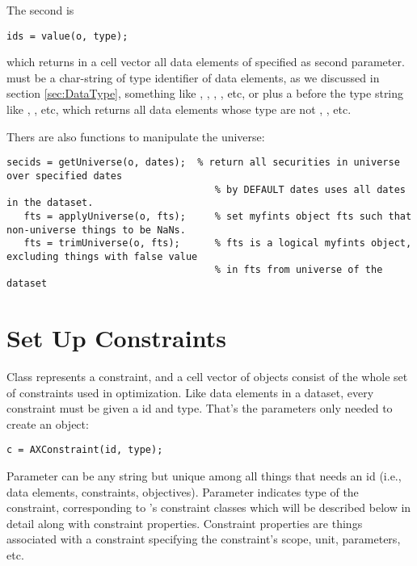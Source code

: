The second is 
\begin{lstlisting}[numbers=none]
   ids = value(o, type); 
\end{lstlisting}
which returns in a cell vector all data elements of  specified as second parameter.
 must be a char-string of type identifier of data elements,
as we discussed in section \ref{sec:DataType},
something like , , , , etc,
or plus a  before the type string like , , etc,
which returns all data elements whose type are not , , etc.

Thers are also functions to manipulate the universe:
\begin{lstlisting}[numbers=none]
   secids = getUniverse(o, dates);  % return all securities in universe over specified dates
                                    % by DEFAULT dates uses all dates in the dataset.
   fts = applyUniverse(o, fts);     % set myfints object fts such that non-universe things to be NaNs.
   fts = trimUniverse(o, fts);      % fts is a logical myfints object, excluding things with false value
                                    % in fts from universe of the dataset
\end{lstlisting}


\section{Set Up Constraints}

Class  represents a constraint,
and a cell vector of  objects consist of the whole set of constraints used in optimization.
Like data elements in a dataset, 
every constraint must be given a id and type.
That's the parameters only needed to create an  object:

\begin{lstlisting}[numbers=none]
   c = AXConstraint(id, type);
\end{lstlisting}

Parameter  can be any string but unique among all things that needs an id (i.e., data elements, constraints, objectives).
Parameter  indicates type of the constraint, corresponding to \axioma{}'s constraint classes which
will be described below in detail along with constraint properties.
Constraint properties are things associated with a constraint specifying the constraint's scope, unit, parameters, etc.

